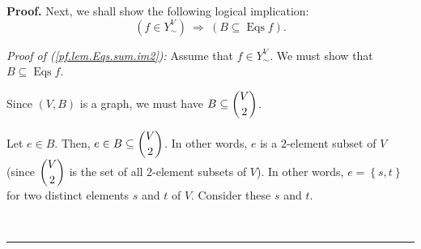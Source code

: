 \documentclass[numbers=enddot,12pt,final,onecolumn,notitlepage]{scrartcl}%
\theoremstyle{definition}
\newenvironment{proof}[1][Proof]{\noindent\textbf{#1.} }{\ \rule{0.5em}{0.5em}}
\newenvironment{verlong}{}{}
\begin{document}
\begin{verlong}
\begin{proof}
Next, we shall show the following logical implication:%
\begin{equation}
\left(  f\in Y_{\sim}^{V}\right)  \ \Longrightarrow\ \left(  B\subseteq
\operatorname*{Eqs}f\right)  . \label{pf.lem.Eqs.sum.im2}%
\end{equation}


\textit{Proof of (\ref{pf.lem.Eqs.sum.im2}):} Assume that $f\in Y_{\sim}^{V}$.
We must show that $B\subseteq\operatorname*{Eqs}f$.

Since $\left(  V,B\right)  $ is a graph, we must have $B\subseteq\dbinom{V}%
{2}$.

Let $e\in B$. Then, $e\in B\subseteq\dbinom{V}{2}$. In other words, $e$ is a
$2$-element subset of $V$ (since $\dbinom{V}{2}$ is the set of all $2$-element
subsets of $V$). In other words, $e=\left\{  s,t\right\}  $ for two distinct
elements $s$ and $t$ of $V$. Consider these $s$ and $t$.


\end{proof}
\end{verlong}
\end{document}
